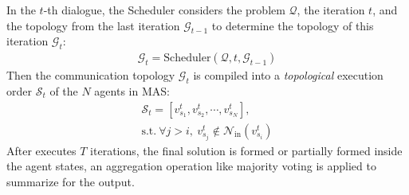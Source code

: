 In the $t$-th dialogue, the Scheduler considers the problem $\mathcal{Q}$, the iteration $t$, and the topology from the last iteration $\mathcal{G}_{t-1}$ to determine the topology of this iteration $\mathcal{G}_{t}$:
\begin{gather}
    \mathcal{G}_{t} = \text{Scheduler}(\mathcal{Q}, t, \mathcal{G}_{t-1})
\end{gather}
Then the communication topology $\mathcal{G}_t$ is compiled into a \textit{topological} execution order $\mathcal{S}_t$ of the $N$ agents in MAS:
\begin{gather}
    \mathcal{S}_t = [v^t_{s_1}, v^t_{s_2}, \cdots, v^t_{s_N}],\\
    \text{s.t.} \ \forall j>i, \ v^t_{s_j} \notin \mathcal{N}_{\text{in}}(v^t_{s_{i}})
\end{gather}
After \ourmethod executes $T$ iterations, the final solution is formed or partially formed inside the agent states, an aggregation operation like majority voting is applied to summarize for the output.